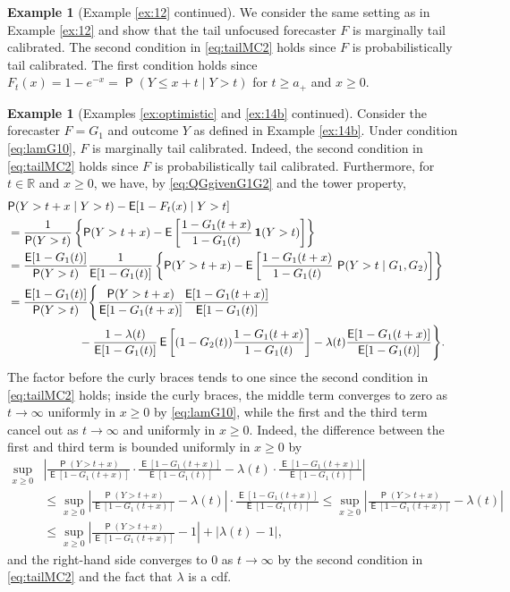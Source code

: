 \documentclass[12pt]{article}
\newcommand{\E}{\operatorname{\mathsf{E}}}
\newcommand{\Q}{\operatorname{\mathsf{P}}}
\newcommand{\R}{\mathbb{R}}
\newcommand{\1}{\mathbf{1}} %
\theoremstyle{definition}
\newtheorem{example}[propo]{Example}
\begin{document}
\begin{example}[Example \ref{ex:12} continued]\label{ex:24}
We consider the same setting as in Example \ref{ex:12} and show that the tail unfocused forecaster $F$ is marginally tail calibrated. The second condition in \eqref{eq:tailMC2} holds since $F$ is probabilistically tail calibrated. The first condition holds since $F_t(x) = 1-e^{-x} = \Q(Y \le x+t \mid Y > t)$ for $t \ge a_+$ and $x \ge 0$. 
\end{example}

\begin{example}[Examples \ref{ex:optimistic} and \ref{ex:14b} continued]\label{ex:14c}
Consider the forecaster $F=G_1$ and outcome $Y$ as defined in Example \ref{ex:14b}. Under condition \eqref{eq:lamG10}, $F$ is marginally tail calibrated. Indeed, the second condition in \eqref{eq:tailMC2} holds since $F$ is probabilistically tail calibrated. Furthermore, for $t \in \R$ and $x \ge 0$, we have, by \eqref{eq:QGgivenG1G2} and the tower property,
\begin{align*}
	\lefteqn{\Q(Y > t+x \mid Y > t) - \E[1-F_t(x) \mid Y > t]} \\
	&= \frac{1}{\Q(Y > t)} \left\{
		\Q(Y > t+x) - 
		\E \left[ 
			\frac{1-G_1(t+x)}{1-G_1(t)} \, \1(Y > t)
		\right]
	\right\} \\
	&= \frac{\E[1-G_1(t)]}{\Q(Y > t)}
	\frac{1}{\E[1-G_1(t)]} \left\{
		\Q(Y > t+x)
		-
		\E \left[ 
		\frac{1-G_1(t+x)}{1-G_1(t)} \, \Q(Y > t \mid G_1,G_2)
		\right]
	\right\} \\
	&= \frac{\E[1-G_1(t)]}{\Q(Y > t)}
	\Bigg\{
		\frac{\Q(Y > t+x)}{\E[1-G_1(t+x)]}
		\frac{\E[1-G_1(t+x)]}{\E[1-G_1(t)]}\\
		& \qquad \qquad \qquad- \frac{1-\lambda(t)}{\E[1-G_1(t)]}
		\E \left[ (1-G_2(t)) \frac{1-G_1(t+x)}{1-G_1(t)} \right]  - \lambda(t) \frac{\E[1-G_1(t+x)]}{\E[1-G_1(t)]}
	\Bigg\}.
\end{align*}
The factor before the curly braces tends to one since the second condition in \eqref{eq:tailMC2} holds; inside the curly braces, the middle term converges to zero as $t \to \infty$ uniformly in $x \ge 0$ by \eqref{eq:lamG10}, while the first and the third term cancel out as $t \to \infty$ and uniformly in $x \ge 0$.
Indeed, the difference between the first and third term is bounded uniformly in $x \ge 0$ by
\begin{align*}
	\sup_{x \ge 0} &\left|
		\frac{\Q(Y > t+x)}{\E[1-G_1(t+x)]} \cdot
		\frac{\E[1-G_1(t+x)]}{\E[1-G_1(t)]}
		- 
		\lambda(t) \cdot \frac{\E[1-G_1(t+x)]}{\E[1-G_1(t)]}
	\right| \\
	&\le
	\sup_{x \ge 0} \left|
		\frac{\Q(Y > t+x)}{\E[1-G_1(t+x)]}
		- \lambda(t)
	\right| \cdot
	\frac{\E[1-G_1(t+x)]}{\E[1-G_1(t)]} \le
	\sup_{x \ge 0} \left|
	\frac{\Q(Y > t+x)}{\E[1-G_1(t+x)]}
	- \lambda(t)
	\right| \\
	&\le
	\sup_{x \ge 0} \left|
		\frac{\Q(Y > t+x)}{\E[1-G_1(t+x)]}
		- 1
	\right|
	+ \left| \lambda(t) - 1 \right|,
\end{align*}
and the right-hand side converges to $0$ as $t \to \infty$ by the second condition in \eqref{eq:tailMC2} and the fact that $\lambda$ is a cdf.
\end{example}
\end{document}

